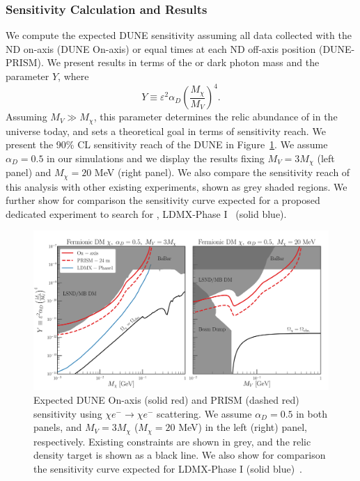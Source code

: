 \subsubsection{Sensitivity Calculation and Results}

We compute the expected DUNE sensitivity assuming all data collected with the ND on-axis (DUNE On-axis) or equal times at each ND off-axis position (DUNE-PRISM). We present results in terms of the  or dark photon mass and the parameter $Y$, where
\begin{equation}
Y \equiv \varepsilon^2 \alpha_D \left(\frac{M_\chi}{M_V}\right)^4.    
\end{equation}
Assuming $M_V \gg M_\chi$, this parameter determines the relic abundance of  in the universe today, and sets a theoretical goal in terms of sensitivity reach. We present the 90\% CL sensitivity reach of the DUNE  in Figure~\ref{fig:chisq}. 
We assume $\alpha_D = 0.5$ in our simulations and we display the results fixing $M_V = 3M_\chi$ (left panel) and $M_\chi = 20$ MeV (right panel).
We also compare the sensitivity reach of this analysis with other existing experiments, shown as grey shaded regions. We further show for comparison the sensitivity curve expected for a proposed dedicated experiment to search for , LDMX-Phase I~\cite{Akesson:2018vlm} (solid blue).

 \begin{figure}[t]
 \centering
 \includegraphics[width=\linewidth]{graphics/LDM_Sensitivity.pdf}
 \caption[90$\%$  limit for Y as a function of $m_{\chi}$ at the ND]{\label{fig:chisq} Expected DUNE On-axis (solid red) and PRISM (dashed red) sensitivity using $\chi e^- \to \chi e^-$ scattering. We assume $\alpha_D = 0.5$ in both panels, and $M_V = 3M_\chi$ ($M_\chi = 20$ MeV) in the left (right) panel, respectively. Existing constraints are shown in grey, and the relic density target is shown as a black line. We also show for comparison the sensitivity curve expected for LDMX-Phase I (solid blue)~\cite{Akesson:2018vlm}.
 }
 \end{figure}


